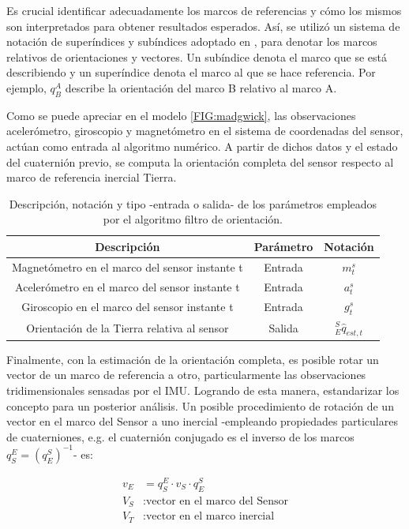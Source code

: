 Es crucial identificar adecuadamente los marcos de referencias y cómo los mismos son interpretados para obtener resultados esperados. Así, se utilizó un sistema de notación de superíndices y subíndices adoptado en \cite{1987Merat}, para denotar los marcos relativos de orientaciones y vectores. Un subíndice denota el marco que se está describiendo y un superíndice denota el marco al que se hace referencia. Por ejemplo, \textbf{$q_{B}^{A}$} describe la orientación del marco B relativo al marco A.

Como se puede apreciar en el modelo \ref{FIG:madgwick}, las observaciones acelerómetro, giroscopio y magnetómetro en el sistema de coordenadas del sensor, actúan como entrada al algoritmo numérico. A partir de dichos datos y el estado del cuaternión previo, se computa la orientación completa del sensor respecto al marco de referencia inercial Tierra. 

\begin{table}[H] 
\caption{Descripción, notación y tipo -entrada o salida- de los parámetros empleados por el algoritmo filtro de orientación.}
\centering
\begin{tabular}{ |c|c|c| } 
 \hline
 \textbf{Descripción} & \textbf{Parámetro} & \textbf{Notación} \\ \hline
 Magnetómetro en el marco del sensor  instante t & Entrada & $m_{t}^{s}$    \\ \hline
 Acelerómetro en el marco del sensor  instante t & Entrada & $a_{t}^{s}$  \\ \hline
 Giroscopio en el marco del sensor instante t & Entrada & $g_{t}^{s}$   \\ \hline
 Orientación de la Tierra relativa al sensor & Salida & $_{E}^{S}\hat{q}_{est,t}$  \\ 
 \hline
\end{tabular}
\end{table}

Finalmente, con la estimación de la orientación completa, es posible rotar un vector de un marco de referencia a otro, particularmente las observaciones tridimensionales sensadas por el IMU. Logrando de esta manera, estandarizar los concepto para un posterior análisis. Un posible procedimiento de rotación de un vector en el marco del Sensor a uno inercial -empleando propiedades particulares de cuaterniones, e.g. el cuaternión conjugado es el inverso de los marcos $q_{S}^{E} = (q_{E}^{S})^{-1}$- es:

\begin{align*}
    v_E&=q_{S}^{E}\cdot v_S \cdot q_{E}^{S}\\
    V_S&: \text{vector en el marco del Sensor}\\
    V_T&: \text{vector en el marco inercial}
\end{align*}


